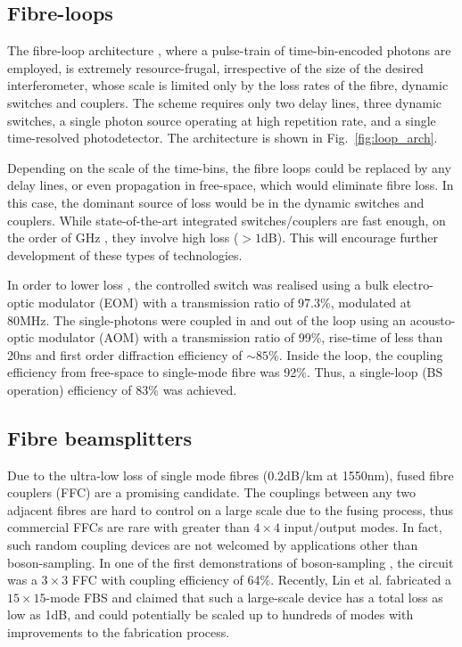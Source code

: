 \documentclass[aps,rmp,twocolumn,amsmath,amssymb,nofootinbib,superscriptaddress]{revtex4}
\begin{document}
\subsection{Fibre-loops}

The fibre-loop architecture \cite{bib:11, bib:19}, where a pulse-train of time-bin-encoded photons are employed, is extremely resource-frugal, irrespective of the size of the desired interferometer, whose scale is limited only by the loss rates of the fibre, dynamic switches and couplers. The scheme requires only two delay lines, three dynamic switches, a single photon source operating at high repetition rate, and a single time-resolved photodetector. The architecture is shown in Fig.~\ref{fig:loop_arch}.

Depending on the scale of the time-bins, the fibre loops could be replaced by any delay lines, or even propagation in free-space, which would eliminate fibre loss. In this case, the dominant source of loss would be in the dynamic switches and couplers. While state-of-the-art integrated switches/couplers are fast enough, on the order of GHz \cite{bib:76, bib:77}, they involve high loss ($>1$dB). This will encourage further development of these types of technologies.

In order to lower loss \cite{bib:11}, the controlled switch was realised using a bulk electro-optic modulator (EOM) with a transmission ratio of 97.3\%, modulated at 80MHz. The single-photons were coupled in and out of the loop using an acousto-optic modulator (AOM) with a transmission ratio of 99\%, rise-time of less than 20ns and first order diffraction efficiency of $\sim 85\%$. Inside the loop, the coupling efficiency from free-space to single-mode fibre was 92\%. Thus, a single-loop (BS operation) efficiency of 83\% was achieved.

\subsection{Fibre beamsplitters}

Due to the ultra-low loss of single mode fibres (0.2dB/km at 1550nm), fused fibre couplers (FFC) are a promising candidate. The couplings between any two adjacent fibres are hard to control on a large scale due to the fusing process, thus commercial FFCs are rare with greater than $4\times 4$ input/output modes. In fact, such random coupling devices are not welcomed by applications other than boson-sampling. In one of the first demonstrations of boson-sampling \cite{bib:10}, the circuit was a $3\times 3$ FFC with coupling efficiency of 64\%. Recently, Lin et al. \cite{bib:78} fabricated a $15\times 15$-mode FBS and claimed that such a large-scale device has a total loss as low as 1dB, and could potentially be scaled up to hundreds of modes with improvements to the fabrication process.
\end{document}

